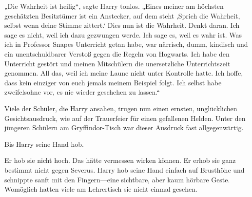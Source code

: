 „Die Wahrheit ist heilig“, sagte Harry tonlos. „Eines meiner am höchsten geschätzten Besitztümer ist ein Anstecker, auf dem steht ‚Sprich die Wahrheit, selbst wenn deine Stimme zittert.‘ Dies nun ist die Wahrheit. Denkt daran. Ich sage es nicht, weil ich dazu gezwungen werde. Ich sage es, weil es wahr ist. Was ich in Professor Snapes Unterricht getan habe, war närrisch, dumm, kindisch und ein unentschuldbarer Verstoß gegen die Regeln von Hogwarts. Ich habe den Unterricht gestört und meinen Mitschülern die unersetzliche Unterrichtszeit genommen. All das, weil ich meine Laune nicht unter Kontrolle hatte. Ich hoffe, dass kein einziger von euch jemals meinem Beispiel folgt. Ich selbst habe zweifelsohne vor, es nie wieder geschehen zu lassen.“

Viele der Schüler, die Harry ansahen, trugen nun einen ernsten, unglücklichen Gesichtsausdruck, wie auf der Trauerfeier für einen gefallenen Helden. Unter den jüngeren Schülern am Gryffindor-Tisch war dieser Ausdruck fast allgegenwärtig.

Bis Harry seine Hand hob.

Er hob sie nicht hoch. Das hätte vermessen wirken können. Er erhob sie ganz bestimmt nicht gegen Severus. Harry hob seine Hand einfach auf Brusthöhe und schnippte sanft mit den Fingern—eine sichtbare, aber kaum hörbare Geste. Womöglich hatten viele am Lehrertisch sie nicht einmal gesehen.

